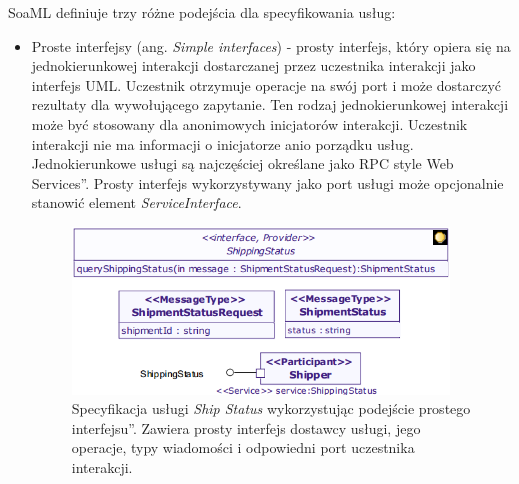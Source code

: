 SoaML definiuje trzy różne podejścia dla specyfikowania usług: 
\begin{itemize}
\item{Proste interfejsy (ang. \emph{Simple interfaces}) - prosty interfejs, który opiera się na jednokierunkowej interakcji dostarczanej przez uczestnika interakcji jako interfejs UML. Uczestnik otrzymuje operacje na swój port i może dostarczyć rezultaty dla wywołującego zapytanie. Ten rodzaj jednokierunkowej interakcji może być stosowany dla anonimowych inicjatorów interakcji. Uczestnik interakcji nie ma informacji o inicjatorze anio  porządku usług. Jednokierunkowe usługi są najczęściej określane jako \quotedblbase RPC style Web Services\textquotedblright. Prosty interfejs wykorzystywany jako port usługi może opcjonalnie stanowić element \emph{ServiceInterface}.} \cite{SOAMLOMG}

\begin{figure}[h!tbp]
\begin{centering}
\includegraphics[width=10cm]{img/simple_interface_based_approach.png}
\caption[Specyfikacja usługi \emph{Ship Status} wykorzystując podejście \quotedblbase prostego interfejsu\textquotedblright. Zawiera prosty interfejs dostawcy usługi, jego operacje, typy wiadomości i odpowiedni port uczestnika interakcji.]{Specyfikacja usługi \emph{Ship Status} wykorzystując podejście \quotedblbase prostego interfejsu\textquotedblright. Zawiera prosty interfejs dostawcy usługi, jego operacje, typy wiadomości i odpowiedni port uczestnika interakcji.\cite{SoaMLErvBase}}\label{simple_interface_based_approach}
\end{centering}
\end{figure}


\end{itemize}
